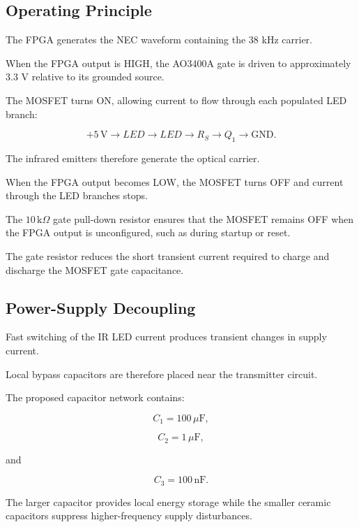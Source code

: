 \documentclass[a4paper,12pt]{article}
\begin{document}

\subsection{Operating Principle}

The FPGA generates the NEC waveform containing the 38 kHz carrier.

When the FPGA output is HIGH, the AO3400A gate is driven to approximately
3.3 V relative to its grounded source.

The MOSFET turns ON, allowing current to flow through each populated
LED branch:

\[
+5\,\text{V}
\rightarrow
LED
\rightarrow
LED
\rightarrow
R_S
\rightarrow
Q_1
\rightarrow
\text{GND}.
\]

The infrared emitters therefore generate the optical carrier.

When the FPGA output becomes LOW, the MOSFET turns OFF and current
through the LED branches stops.

The \(10\,\text{k}\Omega\) gate pull-down resistor ensures that the
MOSFET remains OFF when the FPGA output is unconfigured, such as during
startup or reset.

The gate resistor reduces the short transient current required to
charge and discharge the MOSFET gate capacitance.



\subsection{Power-Supply Decoupling}

Fast switching of the IR LED current produces transient changes in
supply current.

Local bypass capacitors are therefore placed near the transmitter
circuit.

The proposed capacitor network contains:

\[
C_1 = 100\,\mu\text{F},
\]

\[
C_2 = 1\,\mu\text{F},
\]

and

\[
C_3 = 100\,\text{nF}.
\]

The larger capacitor provides local energy storage while the smaller
ceramic capacitors suppress higher-frequency supply disturbances.
\end{document}
